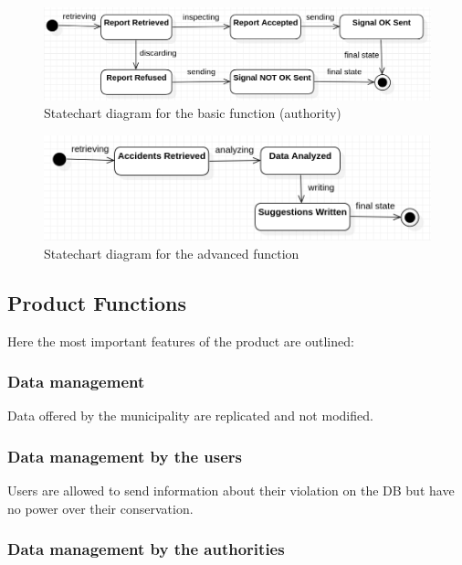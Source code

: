 \begin{figure} [H]
\centering
\includegraphics[width=\textwidth]{Images/Diagrams/State-2.png}
\caption{\label{fig:State-2}Statechart diagram for the basic function (authority)}
\end{figure}

\begin{figure} [H]
\includegraphics[width=\textwidth]{Images/Diagrams/State-3.png}
\caption{\label{fig:State-3}Statechart diagram for the advanced function}
\end{figure}

\subsection{Product Functions}

Here the most important features of the product are outlined:

\subsubsection{Data management}

Data offered by the municipality are replicated and not modified.

\subsubsection*{Data management by the users}

Users are allowed to send information about their violation on the DB but have no power over their conservation. 

\subsubsection*{Data management by the authorities}

